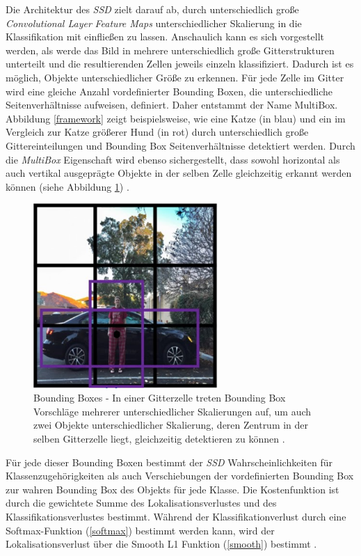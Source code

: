 Die Architektur des \textit{SSD} zielt darauf ab, durch unterschiedlich große \textit{Convolutional Layer} \textit{Feature Maps} unterschiedlicher Skalierung in die Klassifikation mit einfließen zu lassen. Anschaulich kann es sich vorgestellt werden, als werde das Bild in mehrere unterschiedlich große Gitterstrukturen unterteilt und die resultierenden Zellen jeweils einzeln klassifiziert. Dadurch ist es möglich, Objekte unterschiedlicher Größe zu erkennen. Für jede Zelle im Gitter wird eine gleiche Anzahl vordefinierter Bounding Boxen, die unterschiedliche Seitenverhältnisse aufweisen, definiert. Daher entstammt der Name \glqq MultiBox\grqq{}. Abbildung \ref{framework} zeigt beispielsweise, wie eine Katze (in blau) und ein im Vergleich zur Katze größerer Hund (in rot) durch unterschiedlich große Gittereinteilungen und Bounding Box Seitenverhältnisse detektiert werden. Durch die \textit{MultiBox} Eigenschaft wird ebenso sichergestellt, dass sowohl horizontal als auch vertikal ausgeprägte Objekte in der selben Zelle gleichzeitig erkannt werden können (siehe Abbildung \ref{boundingboxes}) \cite{ssd.20161229}.

\begin{figure}[ht]
	\begin{center}
		\includegraphics[width=7cm]{Bilder/bounding_boxes.png} 
		\caption[Bounding Boxes]{Bounding Boxes - In einer Gitterzelle treten Bounding Box Vorschläge mehrerer unterschiedlicher Skalierungen auf, um auch zwei Objekte unterschiedlicher Skalierung, deren Zentrum in der selben Gitterzelle liegt, gleichzeitig detektieren zu können \cite{AndrewNg.2019}.}
		\label{boundingboxes}
	\end{center}
\end{figure}

Für jede dieser Bounding Boxen bestimmt der \textit{SSD} Wahrscheinlichkeiten für Klassenzugehörigkeiten als auch Verschiebungen der vordefinierten Bounding Box zur wahren Bounding Box des Objekts für jede Klasse. Die Kostenfunktion ist durch die gewichtete Summe des Lokalisationsverlustes und des Klassifikationsverlustes bestimmt. Während der Klassifikationverlust durch eine Softmax-Funktion (\ref{softmax}) bestimmt werden kann, wird der Lokalisationsverlust über die Smooth L1 Funktion (\ref{smooth}) bestimmt \cite{ssd.20161229}.


